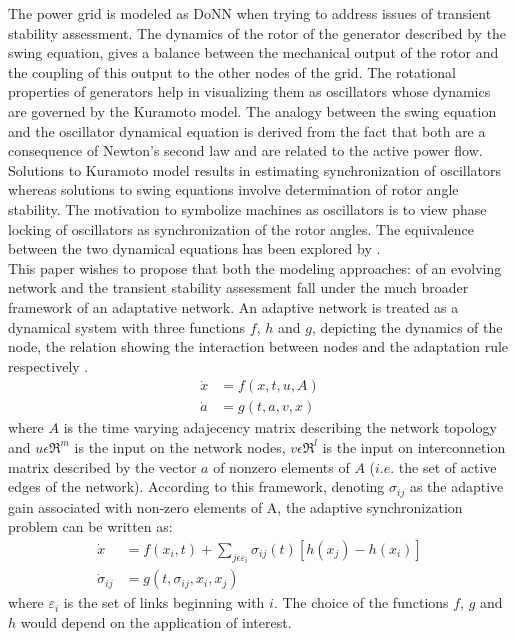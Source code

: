 \documentclass{ifacconf}
\begin{document}
The power grid is modeled as DoNN when trying to address issues of transient stability assessment. The dynamics of the rotor of the generator described by the swing equation, gives a balance between the mechanical output of the rotor and the coupling of this output to the other nodes of the grid. The rotational properties of generators help in visualizing them as oscillators whose dynamics are governed by the Kuramoto model. The analogy between the swing equation and the oscillator dynamical equation is derived from the fact that both are a consequence of Newton's second law and are related to the active power flow. Solutions to Kuramoto model results in estimating synchronization of oscillators whereas solutions to swing equations involve determination of rotor angle stability. The motivation to symbolize machines as oscillators is to view phase locking of oscillators as synchronization of the rotor angles. The equivalence between the two dynamical equations has been explored by \citep{Dor}.\\
This paper wishes to propose that both the modeling approaches: of an evolving network and the transient stability assessment fall under the much broader framework of an adaptative network. 
An adaptive network is treated as a dynamical system with three functions $f$, $h$ and $g$, depicting the dynamics of the node, the relation showing the interaction between nodes and the adaptation rule respectively \citep{De}.\\
\begin{align}
\dot x &=f(x,t,u,A)\\
\dot a &=g(t,a,v,x)
\end{align}
where $A$ is the time varying adajecency matrix describing the network topology and $u \epsilon \Re^m$ is the input on the network nodes, $v \epsilon \Re^l$ is the input on interconnetion matrix described by the vector $a$ of nonzero elements of $A$ ($i.e.$ the set of active edges of the network). According to this framework, denoting $\sigma_{ij} $ as the adaptive gain associated with non-zero elements of A, the adaptive synchronization problem can be written as:
\begin{align}
\dot x &=f(x_{i},t)+\sum_{j \epsilon \varepsilon_{i}} \sigma_{ij}(t) [h(x_{j})-h(x_{i})] \\ \nonumber
\dot \sigma_{ij} &=g(t,\sigma_{ij},x_{i},x_{j})
\end{align}
where $ \varepsilon_{i} $ is the set of links beginning with $i$.
The choice of the functions $f$, $g$ and $h$ would depend on the application of interest. \\
\end{document}
